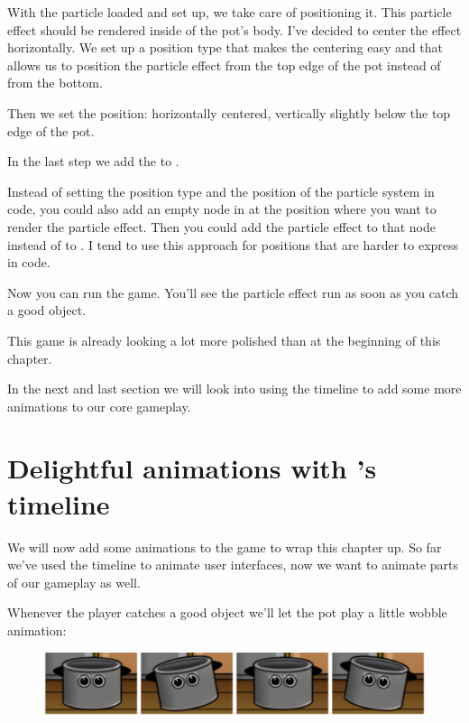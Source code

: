 With the particle loaded and set up, we take care of positioning it. This
particle effect should be rendered inside of the pot's body. I've decided to
center the effect horizontally. We set up a position type that makes the
centering easy and that allows us to position the particle effect from the top
edge of the pot instead of from the bottom.

Then we set the position: horizontally centered, vertically slightly below the
top edge of the pot.

In the last step we add the  to .

\begin{details}
Instead of setting the position type and the position of the particle system in
code, you could also add an empty node in \SB{} at the position where you want
to render the particle effect. Then you could add the particle effect to that
node instead of to . I tend to use this approach for
positions that are harder to express in code.
\end{details}

Now you can run the game. You'll see the particle effect run as soon as you
catch a good object. 

This game is already looking a lot more polished than at the beginning of this
chapter.

In the next and last section we will look into using the \SB{} timeline to add
some more animations to our core gameplay.

\section{Delightful animations with \SB{}'s timeline}
We will now add some animations to the game to wrap this chapter up. So far
we've used the \SB{} timeline to animate user interfaces, now we want to
animate parts of our gameplay as well.

Whenever the player catches a good object we'll let the pot play a little wobble
animation:

\begin{figure}[H]
  \centering
  \includegraphics[width=0.8\linewidth]{images/Chapter9/wobble_animation.png}
\end{figure}

